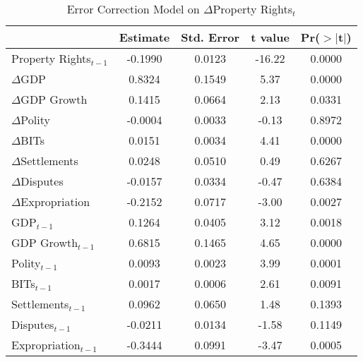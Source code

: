 \begin{table}[ht]
\centering
\label{tab:proprights}
\caption{Error Correction Model on $\Delta$Property Rights$_{t}$}
\begin{tabular}{lcccc}
  \hline\hline
 & Estimate & Std. Error & t value & Pr($>$$|$t$|$) \\ 
  \hline
Property Rights$_{t-1}$ & -0.1990 & 0.0123 & -16.22 & 0.0000 \\ 
\hline
  $\Delta$GDP & 0.8324 & 0.1549 & 5.37 & 0.0000 \\ 
  $\Delta$GDP Growth & 0.1415 & 0.0664 & 2.13 & 0.0331 \\ 
  $\Delta$Polity & -0.0004 & 0.0033 & -0.13 & 0.8972 \\ 
  $\Delta$BITs & 0.0151 & 0.0034 & 4.41 & 0.0000 \\ 
  $\Delta$Settlements & 0.0248 & 0.0510 & 0.49 & 0.6267 \\ 
  $\Delta$Disputes & -0.0157 & 0.0334 & -0.47 & 0.6384 \\ 
  $\Delta$Expropriation & -0.2152 & 0.0717 & -3.00 & 0.0027 \\ 
  \hline
  GDP$_{t-1}$ & 0.1264 & 0.0405 & 3.12 & 0.0018 \\ 
  GDP Growth$_{t-1}$ & 0.6815 & 0.1465 & 4.65 & 0.0000 \\ 
  Polity$_{t-1}$ & 0.0093 & 0.0023 & 3.99 & 0.0001 \\ 
  BITs$_{t-1}$ & 0.0017 & 0.0006 & 2.61 & 0.0091 \\ 
  Settlements$_{t-1}$ & 0.0962 & 0.0650 & 1.48 & 0.1393 \\ 
  Disputes$_{t-1}$ & -0.0211 & 0.0134 & -1.58 & 0.1149 \\ 
  Expropriation$_{t-1}$ & -0.3444 & 0.0991 & -3.47 & 0.0005 \\
   \hline\hline
\end{tabular}
\end{table}